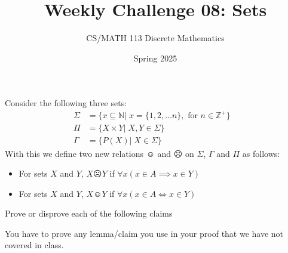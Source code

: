 \documentclass[a4paper]{exam}
\title{Weekly Challenge 08: Sets}
\author{CS/MATH 113 Discrete Mathematics}
\date{Spring 2025}
\begin{document}
\maketitle

\begin{questions}
    Consider the following three sets:
    \begin{align*}
        \Sigma & = \{x \subseteq \mathbb{N} |\; x = \{1, 2,  \dots n\}, \text{ for } n \in \mathbb{Z}^+\}&\\
        \Pi & = \{ X \times Y|\; X,Y \in \Sigma\}&\\
        \Gamma & = \{P(X)|\; X \in \Sigma\}
    \end{align*}
    With this we define two new relations $\smiley$ and $\frownie$ on $\Sigma$, $\Gamma$ and $\Pi$  as follows:  
    \begin{itemize}  
        \item For sets $X$ and $Y$, $X \frownie Y$ if $\forall x (x\in A \implies x\in Y)$  
        \item For sets $X$ and $Y$, $X \smiley Y$ if $\forall x (x\in A \iff x\in Y)$  
    \end{itemize} 

    Prove or disprove each of the following claims
    You have to prove any lemma/claim you use in your proof that we have not covered in class.

\end{questions}
\end{document}
